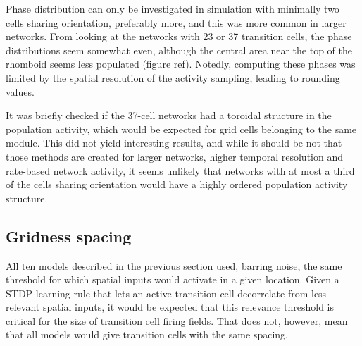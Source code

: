 \documentclass{article}
\begin{document}
    Phase distribution can only be investigated in simulation with minimally two cells sharing orientation, preferably more, and this was more common in larger networks. From looking at the networks with 23 or 37 transition cells, the phase distributions seem somewhat even, although the central area near the top of the rhomboid seems less populated (figure ref). Notedly, computing these phases was limited by the spatial resolution of the activity sampling, leading to rounding values.
    
    It was briefly checked if the 37-cell networks had a toroidal structure in the population activity, which would be expected for grid cells belonging to the same module. This did not yield interesting results, and while it should be not that those methods are created for larger networks, higher temporal resolution and rate-based network activity, it seems unlikely that networks with at most a third of the cells sharing orientation would have a highly ordered population activity structure.

    \subsection{Gridness spacing}

    All ten models described in the previous section used, barring noise, the same threshold for which spatial inputs would activate in a given location. Given a STDP-learning rule that lets an active transition cell decorrelate from less relevant spatial inputs, it would be expected that this relevance threshold is critical for the size of transition cell firing fields. That does not, however, mean that all models would give transition cells with the same spacing.
\end{document}
